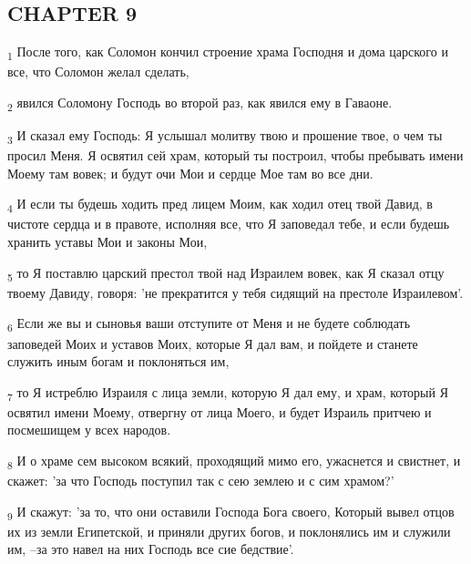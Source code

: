 \subsection{CHAPTER 9}
\begin{tcolorbox}
\textsubscript{1} После того, как Соломон кончил строение храма Господня и дома царского и все, что Соломон желал сделать,
\end{tcolorbox}
\begin{tcolorbox}
\textsubscript{2} явился Соломону Господь во второй раз, как явился ему в Гаваоне.
\end{tcolorbox}
\begin{tcolorbox}
\textsubscript{3} И сказал ему Господь: Я услышал молитву твою и прошение твое, о чем ты просил Меня. Я освятил сей храм, который ты построил, чтобы пребывать имени Моему там вовек; и будут очи Мои и сердце Мое там во все дни.
\end{tcolorbox}
\begin{tcolorbox}
\textsubscript{4} И если ты будешь ходить пред лицем Моим, как ходил отец твой Давид, в чистоте сердца и в правоте, исполняя все, что Я заповедал тебе, и если будешь хранить уставы Мои и законы Мои,
\end{tcolorbox}
\begin{tcolorbox}
\textsubscript{5} то Я поставлю царский престол твой над Израилем вовек, как Я сказал отцу твоему Давиду, говоря: 'не прекратится у тебя сидящий на престоле Израилевом'.
\end{tcolorbox}
\begin{tcolorbox}
\textsubscript{6} Если же вы и сыновья ваши отступите от Меня и не будете соблюдать заповедей Моих и уставов Моих, которые Я дал вам, и пойдете и станете служить иным богам и поклоняться им,
\end{tcolorbox}
\begin{tcolorbox}
\textsubscript{7} то Я истреблю Израиля с лица земли, которую Я дал ему, и храм, который Я освятил имени Моему, отвергну от лица Моего, и будет Израиль притчею и посмешищем у всех народов.
\end{tcolorbox}
\begin{tcolorbox}
\textsubscript{8} И о храме сем высоком всякий, проходящий мимо его, ужаснется и свистнет, и скажет: 'за что Господь поступил так с сею землею и с сим храмом?'
\end{tcolorbox}
\begin{tcolorbox}
\textsubscript{9} И скажут: 'за то, что они оставили Господа Бога своего, Который вывел отцов их из земли Египетской, и приняли других богов, и поклонялись им и служили им, --за это навел на них Господь все сие бедствие'.
\end{tcolorbox}
